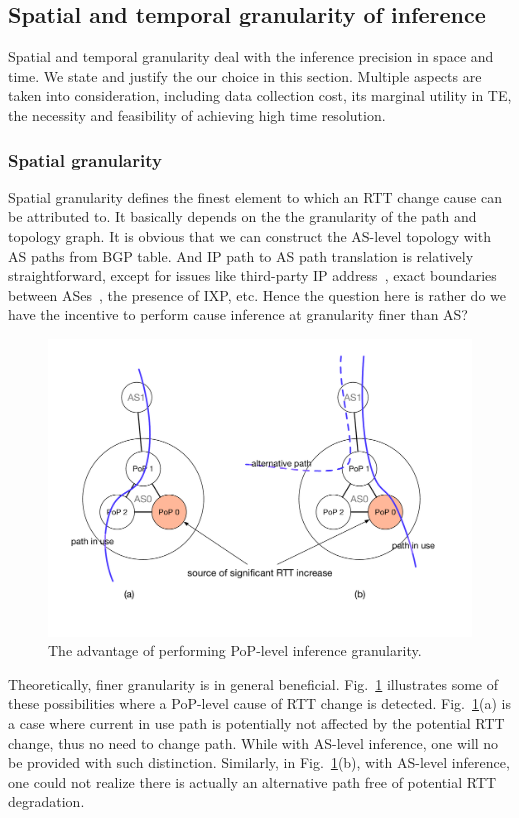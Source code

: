 \subsection{Spatial and temporal granularity of inference}
Spatial and temporal granularity deal with the inference precision in space and time.
We state and justify the our choice in this section. Multiple aspects are taken into consideration, including data collection cost, its marginal utility in TE, the necessity and feasibility of achieving high time resolution.

\subsubsection{Spatial granularity}
\label{sec:chap5_spatial}
Spatial granularity defines the finest element to which an RTT change cause can be attributed to.
It basically depends on the the granularity of the path and topology graph. 
It is obvious that we can construct the AS-level topology with AS paths from BGP table.
And IP path to AS path translation is relatively straightforward, except for issues like third-party IP address~\cite{Hyun2003, Luckie2014a, Zhang2010}, exact boundaries between ASes~\cite{Luckie2016}, the presence of IXP\cite{Nomikos2016}, etc.
Hence the question here is rather do we have the incentive to perform cause inference at granularity finer than AS?

\begin{figure}[!htb]
\centering
\includegraphics[width=.9\textwidth]{gfx/chap5/case_pop_topo.pdf}
\caption{The advantage of performing PoP-level inference granularity.}
\label{fig:chap5_case_pop_topo}
\end{figure}

Theoretically, finer granularity is in general beneficial. Fig.~\ref{fig:chap5_case_pop_topo} illustrates some of these possibilities where a PoP-level cause of RTT change is detected.
Fig.~\ref{fig:chap5_case_pop_topo}(a) is a case where current in use path is potentially not affected by the potential RTT change, thus no need to change path. While with AS-level inference, one will no be provided with such distinction. 
Similarly, in Fig.~\ref{fig:chap5_case_pop_topo}(b), with AS-level inference, one could not realize there is actually an alternative path free of potential RTT degradation.

